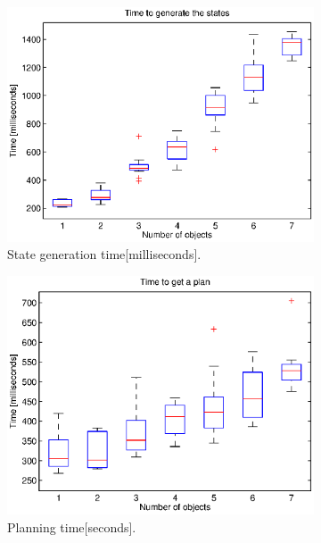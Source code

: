\begin{figure}[tb]
\\
\begin{subfigure}[t]{0.45\textwidth}
\centering
\includegraphics[width=\textwidth]{Img/experiments/exp_good/data/predicates.eps}
\caption{State generation time[milliseconds].}
\label{fig:time_predicates}
\end{subfigure}
\begin{subfigure}[t]{0.45\textwidth}
\centering
\includegraphics[width=\textwidth]{Img/experiments/exp_good/data/planning.eps}
\caption{Planning time[seconds].}\label{fig:time_plan}
\end{subfigure}
\\
\begin{subfigure}[t]{0.4\textwidth}

\end{subfigure}
\end{figure}
